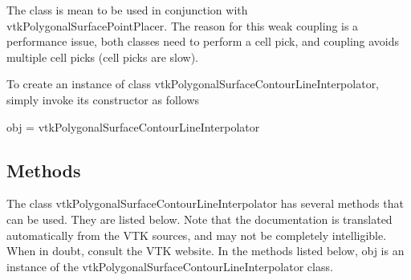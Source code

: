 The class is mean to be used in conjunction with vtk\-Polygonal\-Surface\-Point\-Placer. The reason for this weak coupling is a performance issue, both classes need to perform a cell pick, and coupling avoids multiple cell picks (cell picks are slow).

To create an instance of class vtk\-Polygonal\-Surface\-Contour\-Line\-Interpolator, simply invoke its constructor as follows \begin{DoxyVerb}  obj = vtkPolygonalSurfaceContourLineInterpolator
\end{DoxyVerb}
 \hypertarget{vtkwidgets_vtkxyplotwidget_Methods}{}\subsection{Methods}\label{vtkwidgets_vtkxyplotwidget_Methods}
The class vtk\-Polygonal\-Surface\-Contour\-Line\-Interpolator has several methods that can be used. They are listed below. Note that the documentation is translated automatically from the V\-T\-K sources, and may not be completely intelligible. When in doubt, consult the V\-T\-K website. In the methods listed below, {\ttfamily obj} is an instance of the vtk\-Polygonal\-Surface\-Contour\-Line\-Interpolator class. 
